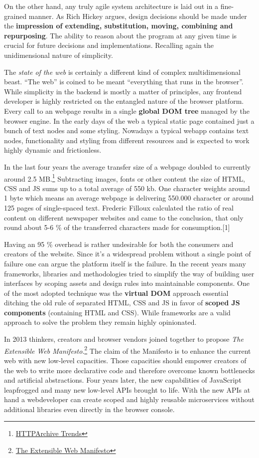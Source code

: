 \documentclass[]{assets/latex/ieee}
\begin{document}
On the other hand, any truly agile system architecture is laid out in a
fine-grained manner. As Rich Hickey argues, design decisions should be
made under the \textbf{impression of extending, substitution, moving,
combining and repurposing}. The ability to reason about the program at
any given time is crucial for future decisions and implementations.
Recalling again the unidimensional nature of simplicity.

The \emph{state of the web} is certainly a different kind of complex
multidimensional beast. ``The web'' is coined to be meant ``everything
that runs in the browser''. While simplicity in the backend is mostly a
matter of principles, any frontend developer is highly restricted on the
entangled nature of the browser platform. Every call to an webpage
results in a single \textbf{global DOM tree} managed by the browser
engine. In the early days of the web a typical static page contained
just a bunch of text nodes and some styling. Nowadays a typical webapp
contains text nodes, functionality and styling from different resources
and is expected to work highly dynamic and frictionless.

In the last four years the average transfer size of a webpage doubled to
currently around 2.5 MB.\footnote{\href{http://httparchive.org/trends.php}{HTTPArchive
  Trends}} Subtracting images, fonts or other content the size of HTML,
CSS and JS sums up to a total average of 550 kb. One character weights
around 1 byte which means an average webpage is delivering 550.000
character or around 125 pages of single-spaced text. Frederic Filloux
calculated the ratio of real content on different newspaper websites and
came to the conclusion, that only round about 5-6 \% of the transferred
characters made for consumption.{[}1{]}

Having an 95 \% overhead is rather undesirable for both the consumers
and creators of the website. Since it's a widespread problem without a
single point of failure one can argue the platform itself is the
failure. In the recent years many frameworks, libraries and
methodologies tried to simplify the way of building user interfaces by
scoping assets and design rules into maintainable components. One of the
most adopted technique was the \textbf{virtual DOM} approach essential
ditching the old rule of separated HTML, CSS and JS in favor of
\textbf{scoped JS components} (containing HTML and CSS). While
frameworks are a valid approach to solve the problem they remain highly
opinionated.

In 2013 thinkers, creators and browser vendors joined together to
propose \emph{The Extensible Web Manifesto}.\footnote{\href{https://extensiblewebmanifesto.org/}{The
  Extensible Web Manifesto}} The claim of the Manifesto is to enhance
the current web with new low-level capacities. Those capacities should
empower creators of the web to write more declarative code and therefore
overcome known bottlenecks and artificial abstractions. Four years
later, the new capabilities of JavaScript leapfrogged and many new
low-level APIs brought to life. With the new APIs at hand a webdeveloper
can create scoped and highly reusable microservices without additional
libraries even directly in the browser console.
\end{document}
